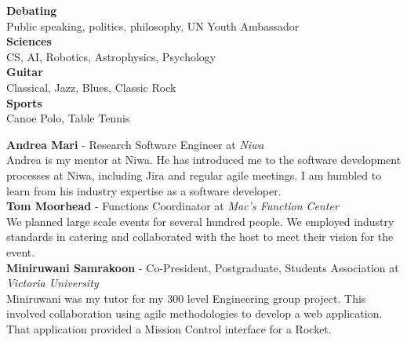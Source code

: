 \documentclass[9pt]{developercv}
\begin{document}



{
  \textbf{Debating} \\
  Public speaking, politics, philosophy, UN Youth Ambassador\\
}
{
  \textbf{Sciences} \\
  CS, AI, Robotics, Astrophysics, Psychology \\
}
{
  \textbf{Guitar} \\
  Classical, Jazz, Blues, Classic Rock \\
}
{
  \textbf{Sports} \\
  Canoe Polo, Table Tennis
}





\textbf{Andrea Mari} - Research Software Engineer at \emph{Niwa} \\
Andrea is my mentor at Niwa. He has introduced me to the software development processes at Niwa, including Jira and regular agile meetings. I am humbled to learn from his industry expertise as a software developer.\\

\textbf{Tom Moorhead} - Functions Coordinator at \emph{Mac's Function Center} \\
We planned large scale events for several hundred people. We employed industry standards in catering and collaborated with the host to meet their vision for the event. \\

\textbf{Miniruwani Samrakoon} - Co-President, Postgraduate, Students Association at \emph{Victoria University} \\
Miniruwani was my tutor for my 300 level Engineering group project. This involved collaboration using agile methodologies to develop a web application. That application provided a Mission Control interface for a Rocket. \\
\end{document}
